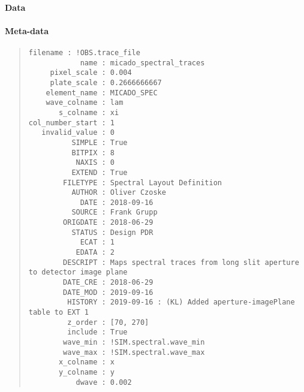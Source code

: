 \paragraph{Data%
  \label{id3}%
}


\paragraph{Meta-data%
  \label{id4}%
}

\begin{quote}
\begin{alltt}
\begin{lstlisting}[frame=single]
        filename : !OBS.trace_file
            name : micado_spectral_traces
     pixel_scale : 0.004
     plate_scale : 0.2666666667
    element_name : MICADO_SPEC
    wave_colname : lam
       s_colname : xi
col_number_start : 1
   invalid_value : 0
          SIMPLE : True
          BITPIX : 8
           NAXIS : 0
          EXTEND : True
        FILETYPE : Spectral Layout Definition
          AUTHOR : Oliver Czoske
            DATE : 2018-09-16
          SOURCE : Frank Grupp
        ORIGDATE : 2018-06-29
          STATUS : Design PDR
            ECAT : 1
           EDATA : 2
        DESCRIPT : Maps spectral traces from long slit aperture to detector image plane
        DATE_CRE : 2018-06-29
        DATE_MOD : 2019-09-16
         HISTORY : 2019-09-16 : (KL) Added aperture-imagePlane table to EXT 1
         z_order : [70, 270]
         include : True
        wave_min : !SIM.spectral.wave_min
        wave_max : !SIM.spectral.wave_max
       x_colname : x
       y_colname : y
           dwave : 0.002
\end{lstlisting}
\end{alltt}
\end{quote}

